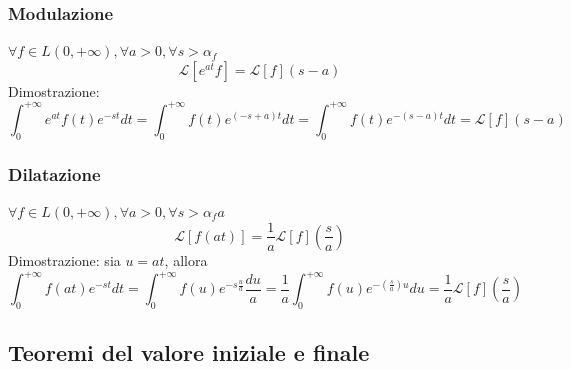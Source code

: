             \subsubsection{Modulazione}
                $\forall f \in L(0, +\infty), \forall a > 0, \forall s > \alpha_f$
                \[
                    \mathcal{L}[e^{at}f] = \mathcal{L}[f](s - a)
                \]
                Dimostrazione:
                \[
                    \int_{0}^{+\infty} e^{at}f(t) e^{-st} dt = \int_{0}^{+\infty} f(t) e^{(-s + a)t} dt = \int_{0}^{+\infty} f(t) e^{-(s - a)t} dt = \mathcal{L}[f](s - a)
                \]

            \subsubsection{Dilatazione}
                $\forall f \in L(0, +\infty), \forall a > 0, \forall s > \alpha_f a$
                \[
                    \mathcal{L}[f(at)] = \frac{1}{a}\mathcal{L}[f](\frac{s}{a})
                \]
                Dimostrazione: sia $u = at$, allora
                \[
                    \int_{0}^{+\infty} f(at)e^{-st} dt = \int_{0}^{+\infty} f(u)e^{-s\frac{u}{a}} \frac{du}{a} = \frac{1}{a} \int_{0}^{+\infty} f(u) e^{-(\frac{s}{a})u} du = \frac{1}{a} \mathcal{L}[f](\frac{s}{a})
                \]

        \subsection{Teoremi del valore iniziale e finale}
